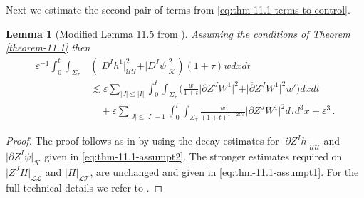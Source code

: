 \documentclass[11pt, a4paper]{amsart}
\numberwithin{equation}{section}
\newtheorem{lemma}[theorem]{Lemma}
\numberwithin{theorem}{section}
\newcommand{\p}{\partial}
\newcommand{\pgood}{\overline{\partial}}
\newcommand{\UU}{{\mathcal{U} \mathcal{U}}}
\newcommand{\LL}{{\mathcal{L} \mathcal{L}}}
\newcommand{\LT}{{\mathcal{L} \mathcal{T}}}
\newcommand{\K}{\mathcal{K}}
\newcommand{\I}{\vert I \vert}
\newcommand{\J}{\vert J \vert}
\begin{document}
Next we estimate the second pair of terms from \eqref{eq:thm-11.1-terms-to-control}. 
\begin{lemma}[Modified Lemma 11.5 from \cite{LR:04}] \label{lemma-11.5}
Assuming the conditions of Theorem \ref{theorem-11.1} then
\begin{align*}
 \varepsilon^{-1} \int_0^t \int_{\Sigma_\tau} & \left( \vert D^I h^1 \vert^2_\UU + \vert D^I \psi \vert^2_\K \right) (1+\tau) w dx dt \\
 &\lesssim \varepsilon \sum_{\J \leq \I} \int_0^t \int_{\Sigma_\tau} \Big( \frac{w}{1+t} \vert \p Z^J W^1 \vert^2 + \vert \pgood Z^J W^1 \vert^2 w' \Big) dx dt \\ & \quad + \varepsilon \sum_{\J \leq \I -1} \int_0^t \int_{\Sigma_\tau} \frac{w}{(1+t)^{1-2C\varepsilon}} \vert \p Z^J W^1 \vert^2 d \tau d^3 x+ \varepsilon ^3 \,.
\end{align*}
\end{lemma}
\begin{proof}
The proof follows as in \cite{LR:04} by using the decay estimates for $\vert \p Z^I h \vert_\UU$ and $\vert \p Z^I \psi \vert_\K$ given in \eqref{eq:thm-11.1-assumpt2}. The stronger estimates required on $\vert Z^J H \vert _\LL$ and $\vert H \vert_\LT$, are unchanged and given in \eqref{eq:thm-11.1-assumpt1}. For the full technical details we refer to \cite{LR:04}. 
\end{proof}
\end{document}
